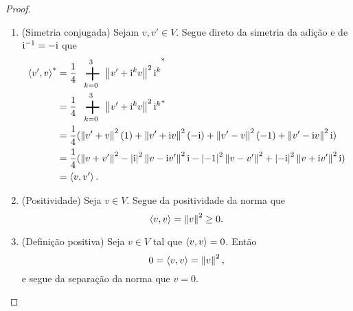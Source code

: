 \begin{proof}
\begin{enumerate}
	(Números complexos) Seja $c \in \R^2$, $c=c_0 + c_1 \ii$. Como $\ii\inv = -\ii$,
		\begin{align*}
		\inte{\ii v}{v'} &= \frac{1}{4} \sum_{k=0}^{3} \nor{\ii v+\ii^kv'}^2 \ii^k \\
			&= \frac{1}{4} \sum_{k=0}^{3} \nor{\ii( v+\ii^{k-1}v')}^2 \ii^k \\
			&= \frac{1}{4} \sum_{k=0}^{3} \abs{\ii}^2\nor{v+\ii^{k-1}v'}^2 \ii^k \\
			&= \ii\frac{1}{4} \sum_{k=0}^{3} \nor{v+\ii^{k-1}v'}^2 \ii^{k-1} \\
			&= \ii\inte{v}{v'}.
		\end{align*}
	Segue da aditividade, da homogeneidade para números reais e da homogeneidade para $\ii$ que
		\begin{align*}
		\inte{cv}{v'} &= \inte{(c_0+c_1 \ii)v}{v'} \\
			&= \inte{c_0 v +c_1 \ii v}{v'} \\
			&= c_0 \inte{v}{v'} + c_1 \ii \inte{v}{v'} \\
			&= (c_0+c_1 \ii)\inte{v}{v'} \\
			&= c\inte{v}{v'}.
		\end{align*}

\item (Simetria conjugada) Sejam $v,v' \in V$. Segue direto da simetria da adição e de $\ii\inv = -\ii$ que
	\begin{align*}
	\conju{\inte{v'}{v}} &= \conju{\frac{1}{4} \sum_{k=0}^{3} \nor{v'+\ii^kv}^2 \ii^k} \\
		&= \frac{1}{4} \sum_{k=0}^{3} \nor{v'+\ii^kv}^2 \conju{\ii^k} \\
		&= \frac{1}{4} (\nor{v'+v}^2 (1) + \nor{v'+\ii v}^2 (-\ii) + \nor{v'-v}^2 (-1) + \nor{v'-\ii v}^2 \ii) \\
		&= \frac{1}{4} (\nor{v+v'}^2 - \abs{\ii}^2\nor{v-\ii v'}^2 \ii - \abs{-1}^2\nor{v-v'}^2 + \abs{-\ii}^2\nor{v+\ii v'}^2 \ii) \\
		&= \inte{v}{v'}.
	\end{align*}

\item (Positividade) Seja $v \in V$. Segue da positividade da norma que
	\begin{equation*}
		\left\langle{v},{v}\right\rangle = \left\Vert{v}\right\Vert^2 \geq 0.
	\end{equation*}

\item (Definição positiva) Seja $v \in V$ tal que $\left\langle{v},{v}\right\rangle=0$. Então
	\begin{equation*}
		0 = \left\langle{v},{v}\right\rangle = \left\Vert{v}\right\Vert^2,
	\end{equation*}
e segue da separação da norma que $v=0$.
\qedhere
\end{enumerate}


\end{proof}
